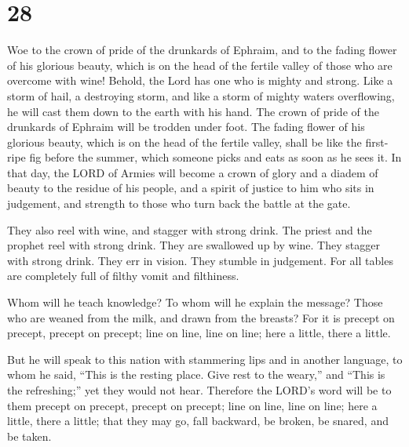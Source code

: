 \hypertarget{section-27}{%
\section{28}\label{section-27}}

 Woe to the crown of pride of the drunkards of Ephraim, and
to the fading flower of his glorious beauty, which is on the head of the
fertile valley of those who are overcome with wine!  Behold,
the Lord has one who is mighty and strong. Like a storm of hail, a
destroying storm, and like a storm of mighty waters overflowing, he will
cast them down to the earth with his hand.  The crown of
pride of the drunkards of Ephraim will be trodden under foot.
 The fading flower of his glorious beauty, which is on the
head of the fertile valley, shall be like the first-ripe fig before the
summer, which someone picks and eats as soon as he sees it. 
In that day, the LORD of Armies will become a crown of glory and a
diadem of beauty to the residue of his people,  and a spirit
of justice to him who sits in judgement, and strength to those who turn
back the battle at the gate.

 They also reel with wine, and stagger with strong drink.
The priest and the prophet reel with strong drink. They are swallowed up
by wine. They stagger with strong drink. They err in vision. They
stumble in judgement.  For all tables are completely full of
filthy vomit and filthiness.

 Whom will he teach knowledge? To whom will he explain the
message? Those who are weaned from the milk, and drawn from the breasts?
 For it is precept on precept, precept on precept; line on
line, line on line; here a little, there a little.

 But he will speak to this nation with stammering lips and
in another language,  to whom he said, ``This is the
resting place. Give rest to the weary,'' and ``This is the refreshing;''
yet they would not hear.  Therefore the LORD's word will be
to them precept on precept, precept on precept; line on line, line on
line; here a little, there a little; that they may go, fall backward, be
broken, be snared, and be taken.

